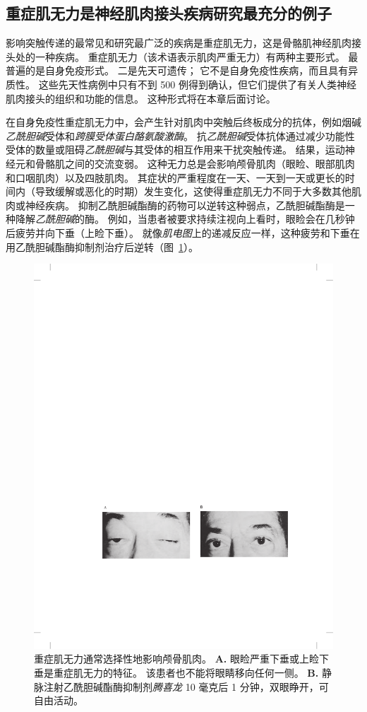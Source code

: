\subsection{重症肌无力是神经肌肉接头疾病研究最充分的例子}

影响突触传递的最常见和研究最广泛的疾病是重症肌无力，这是骨骼肌神经肌肉接头处的一种疾病。
重症肌无力（该术语表示肌肉严重无力）有两种主要形式。
最普遍的是自身免疫形式。
二是先天可遗传；
它不是自身免疫性疾病，而且具有异质性。
这些先天性病例中只有不到 500 例得到确认，但它们提供了有关人类神经肌肉接头的组织和功能的信息。
这种形式将在本章后面讨论。


在自身免疫性重症肌无力中，会产生针对肌肉中突触后终板成分的抗体，例如烟碱\textit{乙酰胆碱}受体和\textit{跨膜受体蛋白酪氨酸激酶}。
抗\textit{乙酰胆碱}受体抗体通过减少功能性受体的数量或阻碍\textit{乙酰胆碱}与其受体的相互作用来干扰突触传递。
结果，运动神经元和骨骼肌之间的交流变弱。
这种无力总是会影响颅骨肌肉（眼睑、眼部肌肉和口咽肌肉）以及四肢肌肉。
其症状的严重程度在一天、一天到一天或更长的时间内（导致缓解或恶化的时期）发生变化，这使得重症肌无力不同于大多数其他肌肉或神经疾病。
抑制乙酰胆碱酯酶的药物可以逆转这种弱点，乙酰胆碱酯酶是一种降解\textit{乙酰胆碱}的酶。
例如，当患者被要求持续注视向上看时，眼睑会在几秒钟后疲劳并向下垂（上睑下垂）。
就像\textit{肌电图}上的递减反应一样，这种疲劳和下垂在用乙酰胆碱酯酶抑制剂治疗后逆转（图~\ref{fig:57_7}）。


\begin{figure}[htbp]
	\centering
	\includegraphics[width=0.75\linewidth]{chap57/fig_57_7}
	\caption{重症肌无力通常选择性地影响颅骨肌肉。
		\textbf{A.} 眼睑严重下垂或上睑下垂是重症肌无力的特征。
		该患者也不能将眼睛移向任何一侧。
		\textbf{B.} 静脉注射乙酰胆碱酯酶抑制剂\textit{腾喜龙} 10 毫克后 1 分钟，双眼睁开，可自由活动。}
	\label{fig:57_7}
\end{figure}


